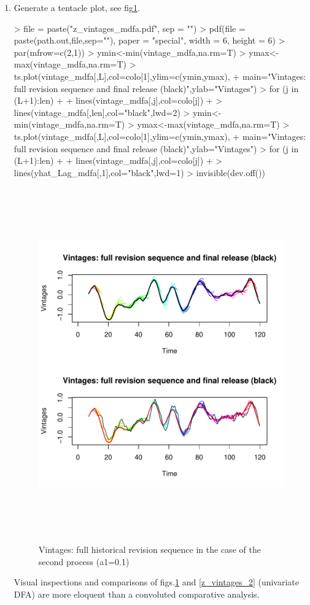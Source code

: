 \documentclass[a4paper]{book}
\begin{document}
\begin{enumerate}
\item Generate a tentacle plot, see fig\ref{z_vintages_mdfa}.
\begin{Schunk}
\begin{Sinput}
> file = paste("z_vintages_mdfa.pdf", sep = "")
> pdf(file = paste(path.out,file,sep=""), paper = "special", width = 6, height = 6)
> par(mfrow=c(2,1))
> ymin<-min(vintage_mdfa,na.rm=T)
> ymax<-max(vintage_mdfa,na.rm=T)
> ts.plot(vintage_mdfa[,L],col=colo[1],ylim=c(ymin,ymax),
+ main="Vintages: full revision sequence and final release (black)",ylab="Vintages")
> for (j in (L+1):len)
+ {
+   lines(vintage_mdfa[,j],col=colo[j])
+ }
> lines(vintage_mdfa[,len],col="black",lwd=2)
> ymin<-min(vintage_mdfa,na.rm=T)
> ymax<-max(vintage_mdfa,na.rm=T)
> ts.plot(vintage_mdfa[,L],col=colo[1],ylim=c(ymin,ymax),
+ main="Vintages: full revision sequence and final release (black)",ylab="Vintages")
> for (j in (L+1):len)
+ {
+   lines(vintage_mdfa[,j],col=colo[j])
+ }
> lines(yhat_Lag_mdfa[,1],col="black",lwd=1)
> invisible(dev.off())
\end{Sinput}
\end{Schunk}
\begin{figure}[H]\begin{center}\includegraphics[height=6in, width=6in]{z_vintages_mdfa.pdf}\caption{Vintages: full historical revision sequence in the case of the second process (a1=0.1)\label{z_vintages_mdfa}}\end{center}\end{figure}Visual inspections and comparisons of figs.\ref{z_vintages_mdfa} and \ref{z_vintages_2} (univariate DFA) are more eloquent than a convoluted comparative analysis.

\end{enumerate}
\end{document}
